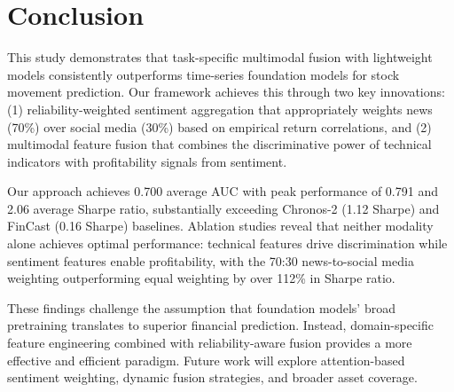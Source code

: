 \documentclass[a4paper,10pt,conference]{IEEEtran}
\begin{document}
\section{Conclusion}

This study demonstrates that task-specific multimodal fusion with lightweight models consistently outperforms time-series foundation models for stock movement prediction. Our framework achieves this through two key innovations: (1) reliability-weighted sentiment aggregation that appropriately weights news (70\%) over social media (30\%) based on empirical return correlations, and (2) multimodal feature fusion that combines the discriminative power of technical indicators with profitability signals from sentiment.

Our approach achieves 0.700 average AUC with peak performance of 0.791 and 2.06 average Sharpe ratio, substantially exceeding Chronos-2 (1.12 Sharpe) and FinCast (0.16 Sharpe) baselines. Ablation studies reveal that neither modality alone achieves optimal performance: technical features drive discrimination while sentiment features enable profitability, with the 70:30 news-to-social media weighting outperforming equal weighting by over 112\% in Sharpe ratio.

These findings challenge the assumption that foundation models' broad pretraining translates to superior financial prediction. Instead, domain-specific feature engineering combined with reliability-aware fusion provides a more effective and efficient paradigm. Future work will explore attention-based sentiment weighting, dynamic fusion strategies, and broader asset coverage.




\iffalse
\newpage
\appendix
\end{document}
